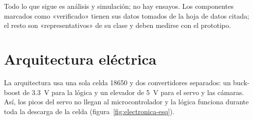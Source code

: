 \begin{nota}[Alcance]
Todo lo que sigue es análisis y simulación; no hay ensayos. Los componentes marcados como
«verificado» tienen sus datos tomados de la hoja de datos citada; el resto son
«representativos» de su clase y deben medirse con el prototipo.
\end{nota}

\section{Arquitectura eléctrica}\label{sec:electronica-arq}

La arquitectura usa una sola celda 18650 y dos convertidores separados: un buck-boost de
\SI{3.3}{V} para la lógica y un elevador de \SI{5}{V} para el servo y las cámaras. Así,
los picos del servo no llegan al microcontrolador y la lógica funciona durante toda la
descarga de la celda (figura~\ref{fig:electronica-esq}).

